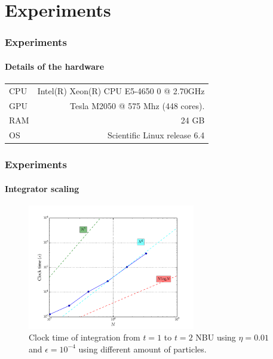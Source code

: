 \section{Experiments}
\begin{frame}
    \frametitle{Experiments}
    \framesubtitle{Details of the hardware}

    \begin{center}
        \begin{tabular}{lr}
            \hline
            {CPU} & Intel(R) Xeon(R) CPU E5-4650 0 @ 2.70GHz \\
            {GPU} & Tesla M2050 @ 575 Mhz (448 cores). \\
            {RAM} & 24 GB \\
            {OS}  & Scientific Linux release 6.4 \\
            \hline
        \end{tabular}
    \end{center}
\end{frame}

\begin{frame}
    \frametitle{Experiments}
    \framesubtitle{Integrator scaling}

\begin{figure}[H]
    \centering
    \label{fig:time}
    \includegraphics[width=0.65\textwidth]{img/test_time-1t-N.pdf}
    \caption{Clock time of integration from $t=1$ to $t=2$ NBU using $\eta = 0.01$ and
             $\epsilon = 10^{-4}$ using different amount of particles.}
\end{figure}

\end{frame}

